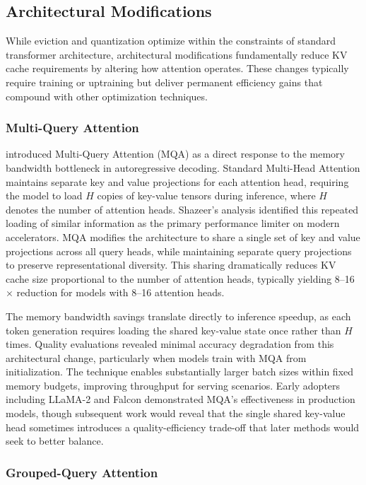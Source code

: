 \subsection{Architectural Modifications}

While eviction and quantization optimize within the constraints of standard transformer architecture, architectural modifications fundamentally reduce KV cache requirements by altering how attention operates. These changes typically require training or uptraining but deliver permanent efficiency gains that compound with other optimization techniques.

\subsubsection{Multi-Query Attention}

\citet{shazeer2019fast} introduced Multi-Query Attention (MQA) as a direct response to the memory bandwidth bottleneck in autoregressive decoding. Standard Multi-Head Attention maintains separate key and value projections for each attention head, requiring the model to load $H$ copies of key-value tensors during inference, where $H$ denotes the number of attention heads. Shazeer's analysis identified this repeated loading of similar information as the primary performance limiter on modern accelerators. MQA modifies the architecture to share a single set of key and value projections across all query heads, while maintaining separate query projections to preserve representational diversity. This sharing dramatically reduces KV cache size proportional to the number of attention heads, typically yielding 8--16$\times$ reduction for models with 8--16 attention heads.

The memory bandwidth savings translate directly to inference speedup, as each token generation requires loading the shared key-value state once rather than $H$ times. Quality evaluations revealed minimal accuracy degradation from this architectural change, particularly when models train with MQA from initialization. The technique enables substantially larger batch sizes within fixed memory budgets, improving throughput for serving scenarios. Early adopters including LLaMA-2 and Falcon demonstrated MQA's effectiveness in production models, though subsequent work would reveal that the single shared key-value head sometimes introduces a quality-efficiency trade-off that later methods would seek to better balance.

\subsubsection{Grouped-Query Attention}

